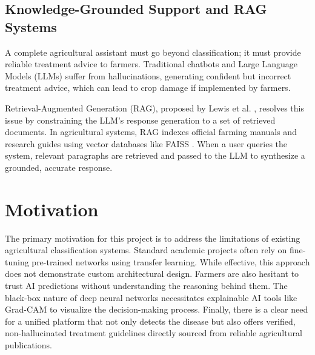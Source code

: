 \documentclass[12pt, a4paper]{report}
\begin{document}
\subsection{Knowledge-Grounded Support and RAG Systems}
A complete agricultural assistant must go beyond classification; it must provide reliable treatment advice to farmers. Traditional chatbots and Large Language Models (LLMs) suffer from hallucinations, generating confident but incorrect treatment advice, which can lead to crop damage if implemented by farmers.

Retrieval-Augmented Generation (RAG), proposed by Lewis et al. \cite{rag}, resolves this issue by constraining the LLM's response generation to a set of retrieved documents. In agricultural systems, RAG indexes official farming manuals and research guides using vector databases like FAISS \cite{faiss}. When a user queries the system, relevant paragraphs are retrieved and passed to the LLM to synthesize a grounded, accurate response.

\section{Motivation}
The primary motivation for this project is to address the limitations of existing agricultural classification systems. Standard academic projects often rely on fine-tuning pre-trained networks using transfer learning. While effective, this approach does not demonstrate custom architectural design. Farmers are also hesitant to trust AI predictions without understanding the reasoning behind them. The black-box nature of deep neural networks necessitates explainable AI tools like Grad-CAM \cite{gradcam} to visualize the decision-making process. Finally, there is a clear need for a unified platform that not only detects the disease but also offers verified, non-hallucinated treatment guidelines directly sourced from reliable agricultural publications.
\end{document}
